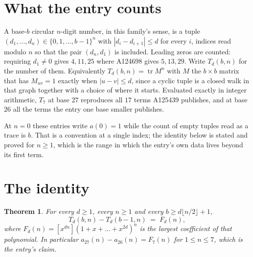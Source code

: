 \documentclass[11pt,a4paper]{article}
\theoremstyle{plain}
\newtheorem{theorem}{Theorem}
\theoremstyle{definition}
\begin{document}
\section{What the entry counts}

A base-$b$ circular $n$-digit number, in this family's sense, is a tuple
$(d_1,\dots,d_n)\in\{0,1,\dots,b-1\}^{n}$ with $|d_i-d_{i+1}|\le d$ for every $i$, indices
read modulo $n$ so that the pair $(d_n,d_1)$ is included. Leading zeros are counted: requiring
$d_1\ne0$ gives $4,11,25$ where A124698 gives $5,13,29$. Write $T_d(b,n)$ for the number of
them. Equivalently $T_d(b,n)=\operatorname{tr}M^{n}$ with $M$ the $b\times b$ matrix that has
$M_{uv}=1$ exactly when $|u-v|\le d$, since a cyclic tuple is a closed walk in that graph
together with a choice of where it starts. Evaluated exactly in integer arithmetic, $T_{7}$
at base $27$ reproduces all $17$ terms A125439 publishes, and at base $26$ all the
terms the entry one base smaller publishes.

At $n=0$ these entries write $a(0)=1$ while the count of empty tuples read as a trace is $b$.
That is a convention at a single index; the identity below is stated and proved for $n\ge1$,
which is the range in which the entry's own data lives beyond its first term.

\section{The identity}

\begin{theorem}
For every $d\ge1$, every $n\ge1$ and every $b\ge d\lfloor n/2\rfloor+1$,
\[
T_d(b,n)-T_d(b-1,n)\;=\;F_d(n),
\]
where $F_d(n)=[x^{dn}](1+x+\dots+x^{2d})^{n}$ is the largest coefficient of that
polynomial. In particular $a_{27}(n)-a_{26}(n)=F_{7}(n)$ for $1\le n\le7$, which
is the entry's claim.
\end{theorem}
\end{document}
